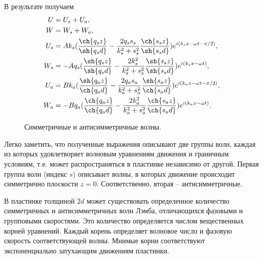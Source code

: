 В результате получаем
\begin{align}
U &= U_s + U_a, \nonumber\\
W &= W_s + W_a, \nonumber\\
U_s &= A k_s( \frac{\ch{q_s z}}{\sh{q_s d}} - \frac{2 q_s s_s}{k_s^2+s_s^2} \frac{\ch{s_s z}}{\sh{s_s d}} ) e^{i(k_s x - \omega t - \pi/2)}, \nonumber\\
W_s &= - A q_s( \frac{\sh{q_s z}}{\sh{q_s d}} - \frac{2 k_s^2}{k_s^2+s_s^2} \frac{\sh{s_s z}}{\sh{s_s d}} ) e^{i(k_s x - \omega t)}, \nonumber\\
U_a &= B k_a( \frac{\sh{q_a z}}{\ch{q_a d}} - \frac{2 q_a s_a}{k_a^2+s_a^2} \frac{\sh{s_a z}}{\ch{s_a d}} ) e^{i(k_a x - \omega t - \pi/2)}, \nonumber\\
W_a &= - B q_a( \frac{\ch{q_a z}}{\ch{q_a d}} - \frac{2 k_a^2}{k_a^2+s_a^2} \frac{\ch{s_a z}}{\ch{s_a d}} ) e^{i(k_a x - \omega t)}.
\end{align}

\begin{figure}[h]
\caption{Симметричные и антисимметричные волны.}
\end{figure}

Легко заметить, что полученные выражения описывают две группы волн, каждая из которых удовлетворяет волновым уравнениям движения и граничным условиям, т.е. может распространяться в пластинке независимо от другой. Первая группа волн (индекс $s$) описывает волны, в которых движение происходит симметрично плоскости $z = 0$. Соответственно, вторая – антисимметричные. 

В пластинке толщиной $2d$ может существовать определенное количество симметричных и антисимметричных волн Лэмба, отличающихся фазовыми и групповыми скоростями. Это количество определяется числом вещественных корней уравнений. Каждый корень определяет волновое число и фазовую скорость соответствующей волны. Мнимые корни соответствуют экспоненциально затухающим движениям пластинки.

